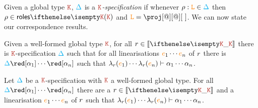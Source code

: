 Given a global type $\aK$, $\textcolor{cyan}{\Delta}$ is a \emph{$\aK$-specification} if
whenever $\rho : \texttt{\textcolor{orange}L} \in \textcolor{cyan}{\Delta}$ then $\arole \in \roles{\aK}$ and
$\aL = \proj[@][@][\ ]$.
%
We can now state our correspondence results.
%
\begin{theorem}\label{thm:gt2local}
  Given a well-formed global type $\aK$, for all $\apom \in \ksem \aK$
  there is $\aK$-specification $\textcolor{cyan}{\Delta}$ such that for all
  linearisations ${\color{orange}{e}}_1 \cdots {\color{orange}{e}}_n$ of $r$ there is
  $\envmv \red[\alpha_1] \cdots \red[\alpha_n]$ such that
  $\lambda_{r}({\color{orange}{e}}_1) \cdots \lambda_{r}({\color{orange}{e}}_n) \vdash \alpha_1
  \cdots \alpha_n$.
\end{theorem}
%
\begin{theorem}\label{thm:local2gt}
  Let $\textcolor{cyan}{\Delta}$ be a $\aK$-specification with $\aK$ a well-formed
  global type.
  For all $\envmv \red[\alpha_1] \cdots \red[\alpha_n]$ there are a
  $\apom \in \ksem \aK$ and a linearisation ${\color{orange}{e}}_1 \cdots {\color{orange}{e}}_n$ of
  $r$ such that
  $\lambda_{r}({\color{orange}{e}}_1) \cdots \lambda_{r}({\color{orange}{e}}_n) \vdash \alpha_1
  \cdots \alpha_n$.
\end{theorem}

